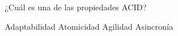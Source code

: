 \question[1] ¿Cuál es una de las propiedades ACID?
\begin{choices}
\choice Adaptabilidad
\CorrectChoice Atomicidad
\choice Agilidad
\choice Asincronía
\end{choices}
